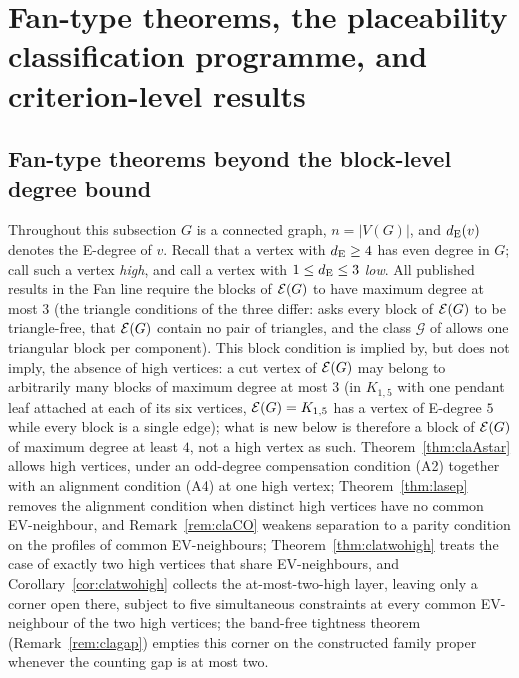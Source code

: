\section{Fan-type theorems, the placeability classification programme, and
criterion-level results}\label{sec:classification}

\subsection{Fan-type theorems beyond the block-level degree bound}
\label{subsec:astar}

Throughout this subsection $G$ is a connected graph, $n=|V(G)|$, and
$d_{\mathrm{E}}(v)$ denotes the E-degree of $v$. Recall that a vertex with
$d_{\mathrm{E}}\ge 4$ has even degree in $G$; call such a vertex \emph{high}, and
call a vertex with $1\le d_{\mathrm{E}}\le 3$ \emph{low}. All published results in
the Fan line \cite{Fan05,BS21,FHZ23} require the blocks of $\mathcal{E}(G)$ to have
maximum degree at most $3$ (the triangle conditions of the three differ:
\cite{Fan05} asks every block of $\mathcal{E}(G)$ to be triangle-free, \cite{FHZ23}
that $\mathcal{E}(G)$ contain no pair of triangles, and the class $\mathcal{G}$ of
\cite{BS21} allows one triangular block per component). This block
condition is implied by, but does not imply, the absence of high vertices:
a cut vertex of $\mathcal{E}(G)$ may belong to arbitrarily many blocks of maximum
degree at most $3$ (in $K_{1,5}$ with one pendant leaf attached at each of
its six vertices, $\mathcal{E}(G)=K_{1,5}$ has a vertex of E-degree $5$ while every
block is a single edge); what is new below is therefore a block of
$\mathcal{E}(G)$ of maximum degree at least $4$, not a high vertex as such.
Theorem~\ref{thm:claAstar} allows high vertices, under an odd-degree
compensation condition (A2) together with an alignment condition (A4) at
one high vertex; Theorem~\ref{thm:lasep} removes the alignment condition
when distinct high vertices have no common EV-neighbour, and
Remark~\ref{rem:claCO} weakens separation to a parity condition on the
profiles of common EV-neighbours; Theorem~\ref{thm:clatwohigh} treats the
case of exactly two high vertices that share EV-neighbours, and
Corollary~\ref{cor:clatwohigh} collects the at-most-two-high layer,
leaving only a corner open there, subject to five simultaneous constraints
at every common EV-neighbour of the two high vertices; the band-free
tightness theorem (Remark~\ref{rem:clagap}) empties this corner on the
constructed family proper whenever the counting gap is at most two.

